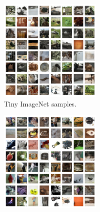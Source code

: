 \documentclass{article}
\newcommand{\figureHeight}{5cm}
\begin{document}
\begin{figure}[t]
    \centering
    \begin{subfigure}[t]{0.49\textwidth}
        \centering
        \includegraphics[height=\figureHeight]{tiny_imagenet_samples.png}
        \caption{\label{fig:tiny_imagenet_samples} Tiny ImageNet samples.}
    \end{subfigure}
    \hfill
    \begin{subfigure}[t]{0.49\textwidth}
        \centering
        \includegraphics[height=\figureHeight]{tiny_imagenet_reconstructions.png}

\end{subfigure}
\end{figure}
\end{document}
